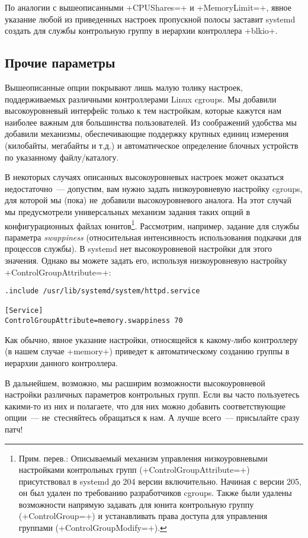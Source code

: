 \documentclass[10pt,oneside,a4paper]{article}
\begin{document}
По аналогии с вышеописанными +CPUShares=+ и +MemoryLimit=+, явное указание любой
из приведенных настроек пропускной полосы заставит systemd создать для службы
контрольную группу в иерархии контроллера +blkio+.

\subsection{Прочие параметры}

Вышеописанные опции покрывают лишь малую толику настроек, поддерживаемых
различными контроллерами Linux cgroups. Мы добавили высокоуровневый интерфейс
только к тем настройкам, которые кажутся нам наиболее важным для большинства
пользователей. Из соображений удобства мы добавили механизмы, обеспечивающие
поддержку крупных единиц измерения (килобайты, мегабайты и т.д.) и
автоматическое определение блочных устройств по указанному файлу/каталогу.

В некоторых случаях описанных высокоуровневых настроек может оказаться
недостаточно~--- допустим, вам нужно задать низкоуровневую настройку cgroups,
для которой мы (пока) не~добавили высокоуровневого аналога. На этот случай мы
предусмотрели универсальных механизм задания таких опций в конфигурационных 
файлах юнитов\footnote{Прим. перев.: Описываемый механизм управления
низкоуровневыми настройками контрольных групп (+ControlGroupAttribute=+)
присутствовал в systemd до 204 версии включительно. Начиная с версии 205, он был
удален по требованию разработчиков cgroups. Также были удалены возможности
напрямую задавать для юнита контрольную группу (+ControlGroup=+) и устанавливать
права доступа для управления группами (+ControlGroupModify=+).}. Рассмотрим,
например, задание для службы параметра \emph{swappiness} (относительная
интенсивность использования подкачки для процессов службы). В systemd нет
высокоуровневой настройки для этого значения.  Однако вы можете задать его,
используя низкоуровневую настройку +ControlGroupAttribute=+:
\begin{Verbatim}
.include /usr/lib/systemd/system/httpd.service

[Service]
ControlGroupAttribute=memory.swappiness 70
\end{Verbatim}
Как обычно, явное указание настройки, относящейся к какому-либо контроллеру (в
нашем случае +memory+) приведет к автоматическому созданию группы в иерархии
данного контроллера.

В дальнейшем, возможно, мы расширим возможности высокоуровневой настройки 
различных параметров контрольных групп. Если вы часто пользуетесь какими-то из
них и полагаете, что для них можно добавить соответствующие опции~---
не~стесняйтесь обращаться к нам. А лучше всего~--- присылайте сразу патч!
\end{document}
